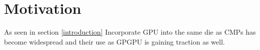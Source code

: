\section{Motivation} \label{motivation}
As seen in section \ref{introduction} Incorporate GPU into the same die as CMPs has become widespread and their use as GPGPU is gaining traction as well.